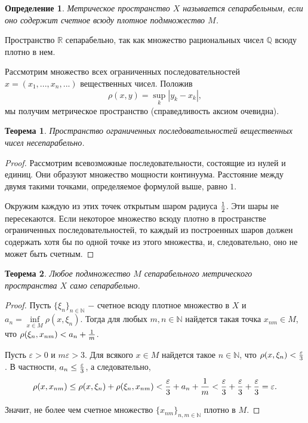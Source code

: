 \documentclass{article}
\newtheorem{theorem}{Теорема}[section]
\newtheorem{definition}{Определение}[section]
\begin{document}
\begin{definition}
Метрическое пространство \(X\) называется сепарабельным, если оно содержит счетное всюду плотное подмножество \(M\).
\end{definition}

Пространство \(\mathbb{R}\) сепарабельно, так как множество рациональных чисел \(\mathbb{Q}\) всюду плотно в нем. \newline

Рассмотрим множество всех ограниченных последовательностей \(x = (x_1, ..., x_n, ...)\) вещественных чисел. Положив
\[
\rho(x, y) = \sup\limits_{k} |y_k - x_k|,
\]
мы получим метрическое пространство (справедливость аксиом очевидна).

\begin{theorem}
Пространство ограниченных последовательностей вещественных чисел несепарабельно.
\end{theorem}

\begin{proof}
Рассмотрим всевозможные последовательности, состоящие из нулей и единиц. Они образуют множество мощности континуума. Расстояние между двумя такими точками, определяемое формулой выше, равно \(1\).

Окружим каждую из этих точек открытым шаром радиуса \({1} \over {2}\). Эти шары не пересекаются. Если некоторое множество всюду плотно в пространстве ограниченных последовательностей, то каждый из построенных шаров должен содержать хотя бы по одной точке из этого множества, и, следовательно, оно не может быть счетным.
\end{proof}

\begin{theorem}
Любое подмножество \(M\) сепарабельного метрического пространства \(X\) само сепарабельно.
\end{theorem}

\begin{proof}
Пусть \(\{\xi_n\}_{n \in \mathbb{N}}\) \(-\) счетное всюду плотное множество в \(X\) и \(a_n = \inf\limits_{x \in M} {\rho(x, \xi_n)}\). Тогда для любых \(m, n \in \mathbb{N}\) найдется такая точка \(x_{nm} \in M\), что \(\rho(\xi_n, x_{nm}) < a_n + {1 \over m}\).

Пусть \(\varepsilon > 0\) и \(m\varepsilon > 3\). Для всякого \(x \in M\) найдется такое \(n \in \mathbb{N}\), что \(\rho(x, \xi_n) < {\varepsilon \over 3}\). В частности, \(a_n \leq {\varepsilon \over 3}\), а следовательно,
\[
\rho(x, x_{nm}) \leq \rho(x, \xi_n) + \rho(\xi_n, x_{nm}) < {\varepsilon \over 3} + a_n + {1 \over m} < {\varepsilon \over 3} + {\varepsilon \over 3} + {\varepsilon \over 3} = \varepsilon.
\]

Значит, не более чем счетное множество \(\{x_{nm}\}_{n, m \in \mathbb{N}}\) плотно в \(M\).
\end{proof}
\end{document}
